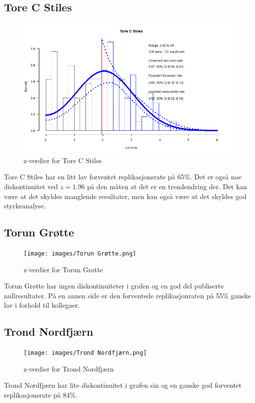 \documentclass[doc,norsk]{apa7}
\begin{document}
\subsection{Tore C Stiles}
\begin{figure}[h!]
    \centering
    \includegraphics[width=\textwidth]{images/Tore C Stiles.png}
    \caption{z-verdier for Tore C Stiles}
\end{figure}
Tore C Stiles har en litt lav forventet replikasjonsrate på 65\%. Det er også noe diskontinuitet ved $z=1.96$ på den måten at det er en trendendring der. Det kan være at det skyldes manglende resultater, men kan også være at det skyldes god styrkeanalyse.

\subsection{Torun Grøtte}
\begin{figure}[h!]
    \centering
    \texttt{[image: images/Torun Grøtte.png]}
    \caption{z-verdier for Torun Grøtte}
\end{figure}
Torun Grøtte har ingen diskontinuiteter i grafen og en god del publiserte nullresultater. På en annen side er den forventede replikasjonraten på 55\% ganske lav i forhold til kollegaer.

\subsection{Trond Nordfjærn}
\begin{figure}[h!]
    \centering
    \texttt{[image: images/Trond Nordfjærn.png]}
    \caption{z-verdier for Trond Nordfjærn}
\end{figure}
Trond Nordfjærn har lite diskontinuitet i grafen sin og en ganske god forventet replikasjonsrate på 84\%.
\end{document}
